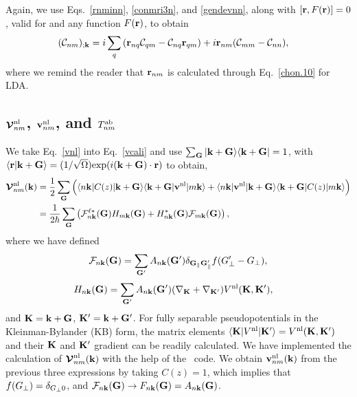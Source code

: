 \documentclass[floatfix,prb,aps,superscriptaddress,11pt,preprint,letterpaper]{revtex4}
\def\chon{black}
\begin{document}
Again, we use Eqs.~\eqref{rnminn}, \eqref{conmri3n}, and \eqref{gendevnn},
along with $[\mathbf{r},F(\mathbf{r})]=0$, valid for 
and any function $F(\mathbf{r})$, 
{\color{\chon} to }obtain 
\begin{align} 
({\mathbf{\cal C}}_{nm})_{;\mathbf{k}}
&=
i 
\sum_{q} 
 \left(\mathbf{r}_{nq}
{\mathbf{\cal C}}_{qm}
-
{\mathbf{\cal C}}_{nq}
\mathbf{r}_{qm}
\right) 
+i\mathbf{r}_{nm}({\mathbf{\cal C}}_{mm}-{\mathbf{\cal C}}_{nn}) 
,
\end{align} 
where we remind the reader that $\mathbf{r}_{nm}$ 
{\color{\chon} is} calculated through 
Eq.~\eqref{chon.10} for LDA. 


\subsection{
\texorpdfstring{$\boldsymbol{\mathcal{\cal V}}^{\mathrm{nl}}_{nm}$}{Vnonlocal},
\texorpdfstring{$\mathbf{v}^{\mathrm{nl}}_{nm}$}{Vnonlocal}, and 
\texorpdfstring{$T^{\mathrm{a}\mathrm{b}}_{nm}$}{[r,vnl]}}
\label{vesnl}

We take Eq.~\eqref{vnl} into Eq.~\eqref{vcali}
and use
$\sum_{\mathbf{G}}| \mathbf{k}+\mathbf{G} \rangle\langle \mathbf{k}+\mathbf{G} |=1$, 
with
$\langle {\mathbf{r}} | {\mathbf{k}+\mathbf{G}} \rangle=(1/\sqrt{\Omega})
\mathrm{exp}(i(\mathbf{k}+\mathbf{G})\cdot\mathbf{r})$
{\color{\chon} to} obtain,
\begin{align}\label{vnl.5}
\boldsymbol{\mathcal{\cal V}}^{\mathrm{nl}}_{nm}(\mathbf{k})&=\frac{1}{2}
\sum_{\mathbf{G}}
\Big(
\langle n\mathbf{k} | C(z) 
| \mathbf{k}+\mathbf{G} \rangle\langle \mathbf{k}+\mathbf{G} |
\mathbf{v}^{\mathrm{nl}} | m\mathbf{k} \rangle
+
\langle n\mathbf{k} |
\mathbf{v}^{\mathrm{nl}}  
| \mathbf{k}+\mathbf{G} \rangle\langle \mathbf{k}+\mathbf{G} |
C(z) | m\mathbf{k} \rangle
\Big)
\nonumber\\
&=\frac{1}{2 \hbar}
\sum_{\mathbf{G}}
\left(
{\mathbf{\cal F}}^{\ell*}_{n\mathbf{k}}(\mathbf{G}) 
H_{m\mathbf{k}}(\mathbf{G}) 
+
H^*_{n\mathbf{k}}(\mathbf{G}) 
{\mathbf{\cal F}}_{m\mathbf{k}}(\mathbf{G}) 
\right) 
,
\end{align}  
where 
we have defined  
\begin{align}\label{vnl.10}
{\mathbf{\cal F}}_{n\mathbf{k}}(\mathbf{G}) 
=
\sum_{\mathbf{G}'} 
A_{n\mathbf{k}}(\mathbf{G}') 
\delta_{\mathbf{G}_\parallel \mathbf{G}'_\parallel}f(G'_\perp-G_\perp) 
,
\end{align} 
\begin{align}\label{vnl.11}
H_{n\mathbf{k}}(\mathbf{G})&=
\sum_{\mathbf{G}'} 
A_{n\mathbf{k}}(\mathbf{G}') 
(\nabla_{\mathbf{K}}+\nabla_{\mathbf{K}'})  
V^{\mathrm{nl}}(\mathbf{K},\mathbf{K}')
,
\end{align}
and $\mathbf{K}=\mathbf{k}+\mathbf{G}$, $\mathbf{K}'=\mathbf{k}+\mathbf{G}'$.
For fully  separable pseudopotentials in the   
Kleinman-Bylander (KB) form,\cite{mottaCMS10,kleinmanPRL82,adolphPRB96}  
the  
matrix elements 
 $\langle \mathbf{K} |  
V^{\mathrm{nl}}  
| \mathbf{K}' \rangle
=V^{\mathrm{nl}}(\mathbf{K},\mathbf{K}')  
$ 
{\color{\chon} and} their $\mathbf{K}$ and $\mathbf{K}'$ gradient 
can be readily calculated.\cite{mottaCMS10,adolphPRB96,gordienkoRPJ04,fuchsCPC99} 
We have 
implemented 
the calculation of $\boldsymbol{\mathcal{\cal V}}^{\mathrm{nl}}_{nm}(\mathbf{k})$ with the help {\color{\chon} of} 
the \depe~code.\cite{francesco}
{\color{\chon} We obtain $\mathbf{v}^{\mathrm{nl}}_{nm}(\mathbf{k})$ from the previous three 
expressions by t}aking $C(z)=1$, which implies 
{\color{\chon} that} $f(G_\perp)=\delta_{G_\perp 0}$, 
and 
${\mathbf{\cal F}}_{n\mathbf{k}}(\mathbf{G}) \to F_{n\mathbf{k}}(\mathbf{G})=A_{n\mathbf{k}}(\mathbf{G})$.
\end{document}
